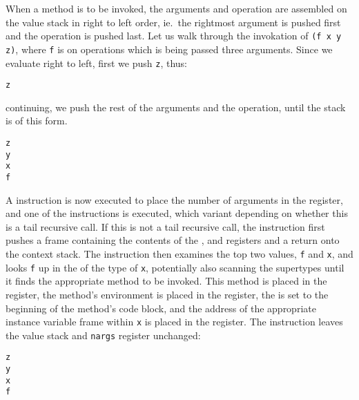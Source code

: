 When a method is to be invoked, the arguments and operation are
assembled on the value stack in right to left order, ie.\ the
rightmost argument is pushed first and the operation is pushed last.
Let us walk through the invokation of \texttt{(f x y z)}, where \texttt{f}
is on operations which is being passed three arguments.  Since we
evaluate right to left, first we push \texttt{z}, thus:
\begin{stackphoto}
\tt z \\\hline
\end{stackphoto}
continuing, we push the rest of the arguments and the operation, until
the stack is of this form.
\begin{stackphoto}
\tt z \\\hline
\tt y \\\hline
\tt x \\\hline
\tt f \\\hline
\end{stackphoto}
A  instruction is now executed to place the number
of arguments in the  register, and one of the 
instructions is executed, which variant depending on whether this is a
tail recursive call.  If this is not a tail recursive call, the
 instruction first pushes a frame containing the contents
of the ,  and  registers
and a return  onto the context stack.  The instruction then
examines the top two values, \texttt{f} and \texttt{x}, and looks \texttt{f} up
in the  of the type of \texttt{x}, potentially
also scanning the supertypes until it finds the appropriate method to
be invoked.  This method is placed in the 
register, the method's environment is placed in the  register,
the  is set to the beginning of the method's code block, and
the address of the appropriate instance variable frame within \texttt{x} is
placed in the  register.  The  instruction leaves
the value stack and \texttt{nargs} register unchanged:
\begin{stackphoto}
\tt z \\\hline
\tt y \\\hline
\tt x \\\hline
\tt f \\\hline
\end{stackphoto}

